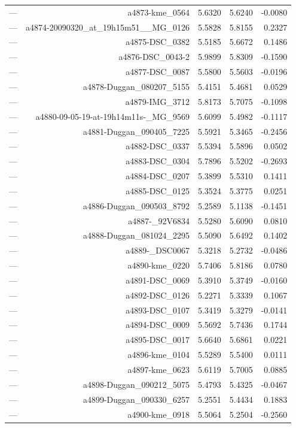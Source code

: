\begin{table}[htbp]
\begin{tabular}{lrrrr}
— & a4873-kme_0564 & 5.6320 & 5.6240 & -0.0080 \\
— & a4874-20090320_at_19h15m51__MG_0126 & 5.5828 & 5.8155 & 0.2327 \\
— & a4875-DSC_0382 & 5.5185 & 5.6672 & 0.1486 \\
— & a4876-DSC_0043-2 & 5.9899 & 5.8309 & -0.1590 \\
— & a4877-DSC_0087 & 5.5800 & 5.5603 & -0.0196 \\
— & a4878-Duggan_080207_5155 & 5.4151 & 5.4681 & 0.0529 \\
— & a4879-IMG_3712 & 5.8173 & 5.7075 & -0.1098 \\
— & a4880-09-05-19-at-19h14m11s-_MG_9569 & 5.6099 & 5.4982 & -0.1117 \\
— & a4881-Duggan_090405_7225 & 5.5921 & 5.3465 & -0.2456 \\
— & a4882-DSC_0337 & 5.5394 & 5.5896 & 0.0502 \\
— & a4883-DSC_0304 & 5.7896 & 5.5202 & -0.2693 \\
— & a4884-DSC_0207 & 5.3899 & 5.5310 & 0.1411 \\
— & a4885-DSC_0125 & 5.3524 & 5.3775 & 0.0251 \\
— & a4886-Duggan_090503_8792 & 5.2589 & 5.1138 & -0.1451 \\
— & a4887-_92V6834 & 5.5280 & 5.6090 & 0.0810 \\
— & a4888-Duggan_081024_2295 & 5.5090 & 5.6492 & 0.1402 \\
— & a4889-_DSC0067 & 5.3218 & 5.2732 & -0.0486 \\
— & a4890-kme_0220 & 5.7406 & 5.8186 & 0.0780 \\
— & a4891-DSC_0069 & 5.3910 & 5.3749 & -0.0160 \\
— & a4892-DSC_0126 & 5.2271 & 5.3339 & 0.1067 \\
— & a4893-DSC_0107 & 5.3419 & 5.3279 & -0.0141 \\
— & a4894-DSC_0009 & 5.5692 & 5.7436 & 0.1744 \\
— & a4895-DSC_0017 & 5.6640 & 5.6861 & 0.0221 \\
— & a4896-kme_0104 & 5.5289 & 5.5400 & 0.0111 \\
— & a4897-kme_0623 & 5.6119 & 5.7005 & 0.0885 \\
— & a4898-Duggan_090212_5075 & 5.4793 & 5.4325 & -0.0467 \\
— & a4899-Duggan_090330_6257 & 5.2551 & 5.4434 & 0.1883 \\
— & a4900-kme_0918 & 5.5064 & 5.2504 & -0.2560 \\

\end{tabular}
\end{table}
